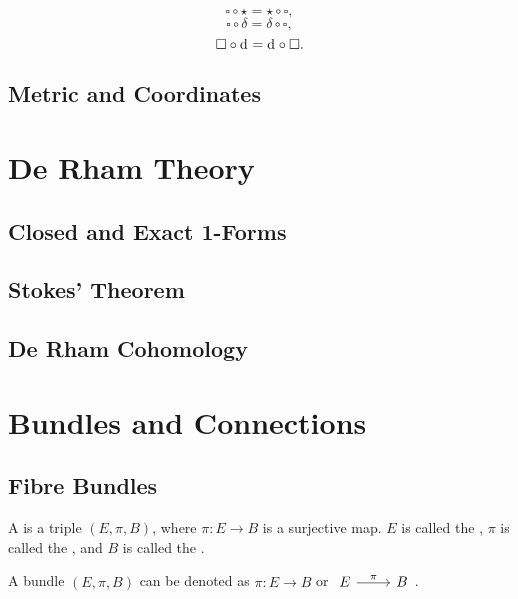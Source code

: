 \documentclass[openany, oneside, a5paper]{book}
\begin{document}
\begin{theorem}
    \begin{equation}
        \square \circ \star = \star \circ \square,
    \end{equation}
    \begin{equation}
        \square \circ \delta = \delta \circ \square,
    \end{equation}
    \begin{equation}
        \square \circ \mathop{}\!\mathrm{d}^{} = \mathop{}\!\mathrm{d}^{} \circ \square.
    \end{equation}
\end{theorem}


\section{Metric and Coordinates}

\chapter{De Rham Theory}
\section{Closed and Exact 1-Forms}
\section{Stokes' Theorem}
\section{De Rham Cohomology}

\chapter{Bundles and Connections}
\section{Fibre Bundles}
\begin{definition}[Bundle]
    A  is a triple $(E, \pi, B)$, where $\pi \colon E \to B$ is a surjective map.
    $E$ is called the , $\pi$ is called the , and $B$ is called the .

    A bundle $(E, \pi, B)$ can be denoted as $\pi \colon E \to B$ or $\begin{tikzcd}
        E \arrow[r, "\pi"] & B
    \end{tikzcd}$.
\end{definition}
\end{document}
